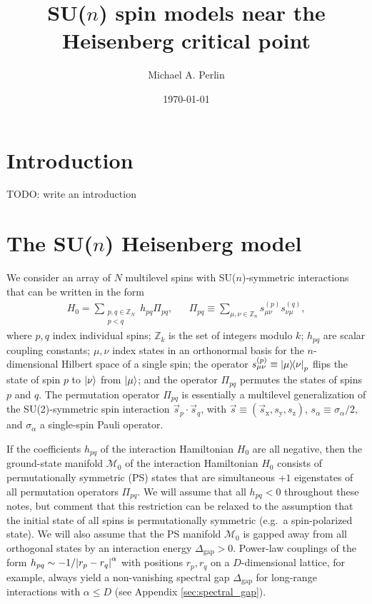 \documentclass[nofootinbib,notitlepage,11pt]{revtex4-2}
\renewcommand{\t}{\text} %
\newcommand{\p}[1]{\left(#1\right)} %
\renewcommand{\c}{\cdot} %
\renewcommand{\v}{\vec} %
\newcommand{\1}{\mathds{1}}
\newcommand{\x}{\text{x}}
\newcommand{\y}{\text{y}}
\newcommand{\z}{\text{z}}
\newcommand{\M}{\mathcal{M}}
\newcommand{\ZZ}{\mathbb{Z}}
\newcommand{\red}[1]{{\color{red} #1}}
\begin{document}
\title{SU($n$) spin models near the Heisenberg critical point}%
\author{Michael A. Perlin}%
\date{\today}

\maketitle

\tableofcontents

\section{Introduction}

\red{TODO: write an introduction}

\section{The SU($n$) Heisenberg model}

We consider an array of $N$ multilevel spins with SU($n$)-symmetric
interactions that can be written in the form
\begin{align}
  H_0 = \sum_{\substack{p,q\in\ZZ_N\\p<q}} h_{pq} \Pi_{pq},
  &&
  \Pi_{pq} \equiv \sum_{\mu,\nu\in\ZZ_n} s_{\mu\nu}^{(p)} s_{\nu\mu}^{(q)},
  \label{eq:H_0}
\end{align}
where $p,q$ index individual spins; $\ZZ_k$ is the set of integers
modulo $k$; $h_{pq}$ are scalar coupling constants; $\mu,\nu$ index
states in an orthonormal basis for the $n$-dimensional Hilbert space
of a single spin; the operator $s_{\mu\nu}^{(p)}\equiv\op{\mu}{\nu}_p$
flips the state of spin $p$ to $\ket\nu$ from $\ket\mu$; and the
operator $\Pi_{pq}$ permutes the states of spins $p$ and $q$.  The
permutation operator $\Pi_{pq}$ is essentially a multilevel
generalization of the SU(2)-symmetric spin interaction
$\v s_p\c\v s_q$, with $\v s\equiv\p{\v s_\x,s_\y,s_\z}$,
$s_\alpha\equiv\sigma_\alpha/2$, and $\sigma_\alpha$ a single-spin
Pauli operator.

If the coefficients $h_{pq}$ of the interaction Hamiltonian $H_0$ are
all negative, then the ground-state manifold $\M_0$ of the interaction
Hamiltonian $H_0$ consists of permutationally symmetric (PS) states
that are simultaneous $+1$ eigenstates of all permutation operators
$\Pi_{pq}$.  We will assume that all $h_{pq}<0$ throughout these
notes, but comment that this restriction can be relaxed to the
assumption that the initial state of all spins is permutationally
symmetric (e.g.~a spin-polarized state).  We will also assume that the
PS manifold $\M_0$ is gapped away from all orthogonal states by an
interaction energy $\Delta_{\t{gap}}>0$.  Power-law couplings of the
form $h_{pq}\sim-1/\abs{r_p-r_q}^\alpha$ with positions $r_p,r_q$ on a
$D$-dimensional lattice, for example, always yield a non-vanishing
spectral gap $\Delta_{\t{gap}}$ for long-range interactions with
$\alpha\le D$ (see Appendix \ref{sec:spectral_gap}).
\end{document}
